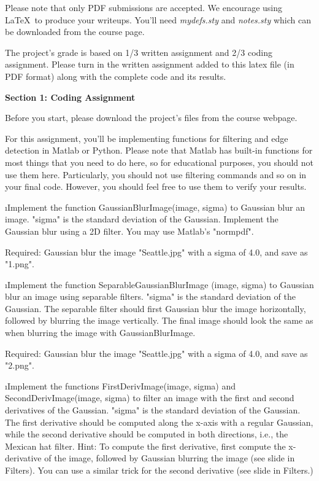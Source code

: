 \documentclass[fleqn]{article}
\begin{document}


Please note that only PDF submissions are accepted. We encourage using \LaTeX\ to produce your writeups. You'll need {\em mydefs.sty} and {\em notes.sty} which can be downloaded from the course page.

The project's grade is based on 1/3 written assignment and 2/3 coding assignment. Please turn in the written assignment added to this latex file (in PDF format) along with the complete code and its results.

{\bf Section 1: Coding Assignment} 
 
Before you start, please download the project's files from the course webpage.

For this assignment, you'll be implementing functions for filtering and edge detection in Matlab or Python. Please note that Matlab has built-in functions for most things that you need to do here, so for educational purposes, you should not use them here. Particularly, you should not use filtering commands and so on in your final code. However, you should feel free to use them to verify your results.
 
\bee
\i Implement the function GaussianBlurImage(image, sigma) to Gaussian blur an image. "sigma" is the standard deviation of the Gaussian. Implement the Gaussian blur using a 2D filter. You may use Matlab's "normpdf".
 
Required: Gaussian blur the image "Seattle.jpg" with a sigma of 4.0, and save as "1.png".
 
\i Implement the function SeparableGaussianBlurImage (image, sigma) to Gaussian blur an image using separable filters. "sigma" is the standard deviation of the Gaussian. The separable filter should first Gaussian blur the image horizontally, followed by blurring the image vertically. The final image should look the same as when blurring the image with GaussianBlurImage.
 
Required: Gaussian blur the image "Seattle.jpg" with a sigma of 4.0, and save as "2.png".
 
\i Implement the functions FirstDerivImage(image, sigma) and SecondDerivImage(image, sigma) to filter an image with the first and second derivatives of the Gaussian. "sigma" is the standard deviation of the Gaussian. The first derivative should be computed along the x-axis with a regular Gaussian, while the second derivative should be computed in both directions, i.e., the Mexican hat filter. Hint: To compute the first derivative, first compute the x-derivative of the image, followed by Gaussian blurring the image (see slide in Filters). You can use a similar trick for the second derivative (see slide in Filters.)
 
\end{document}
